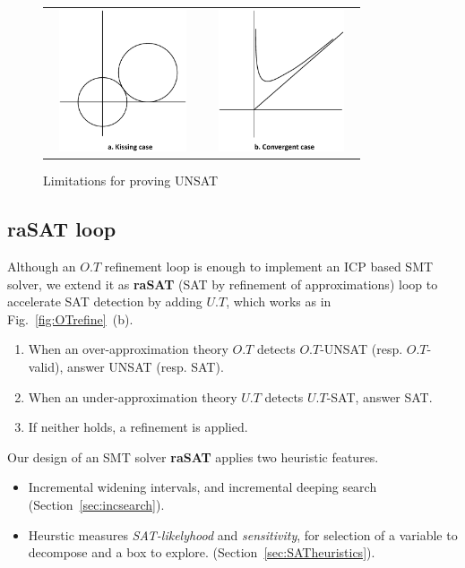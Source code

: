 \documentclass[runningheads,a4paper,oribibl]{llncs}
\begin{document}
\begin{figure}[ht]
\centering
\begin{tabular}{cc}
\includegraphics[height=1.65in,width=1.7in]{kissing.eps} &
\includegraphics[height=1.65in,width=1.7in]{convergence.eps}
\end{tabular}
\caption{Limitations for proving UNSAT} 
\label{fig:limit} 
\end{figure} 



\subsection{raSAT loop}

Although an $O.T$ refinement loop is enough to implement an ICP based SMT solver, 
we extend it as {\bf raSAT} (SAT by refinement of approximations) loop to accelerate SAT detection 
by adding $U.T$, which works as in Fig.~\ref{fig:OTrefine}~(b). 
\begin{enumerate}
\item When an over-approximation theory $O.T$ detects $O.T$-UNSAT (resp. $O.T$-valid), 
answer UNSAT (resp. SAT). 
\item When an under-approximation theory $U.T$ detects $U.T$-SAT, answer SAT. 
\item If neither holds, a refinement is applied. 
\end{enumerate}

Our design of an SMT solver {\bf raSAT} applies two heuristic features. 
\begin{itemize}
\item Incremental widening intervals, and incremental deeping search 
(Section~\ref{sec:incsearch}). 
\item 
Heurstic measures {\em SAT-likelyhood} and {\em sensitivity}, 
for selection of a variable to decompose and a box to explore. 
(Section~\ref{sec:SATheuristics}). 
\end{itemize} 
\end{document}
